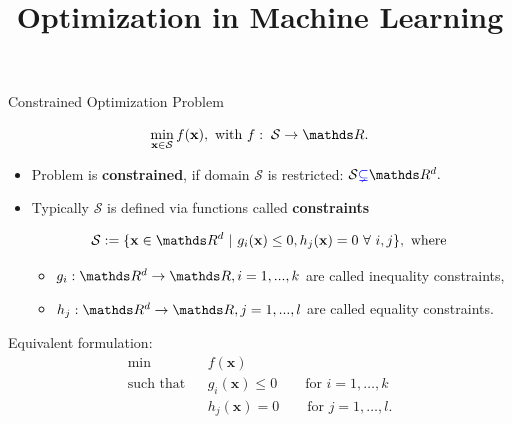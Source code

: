\documentclass[11pt,compress,t,notes=noshow, xcolor=table]{beamer}
\title{Optimization in Machine Learning}
\date{}
\begin{document}
\sloppy

\begin{vbframe}{Constrained Optimization Problem }

$$
\min_{\xv \in \mathcal{S}} \fx, \text{ with } f: \; \mathcal{S} \to \R.
$$

\begin{itemize}
	\item Problem is \textbf{constrained}, if domain $\mathcal{S}$ is restricted: $\mathcal{S} \textcolor{blue}{\subsetneq} \R^d.$

	\item Typically $\mathcal{S}$ is defined via functions called \textbf{constraints}

	$$
		\mathcal{S}:= \{\xv \in \R^d ~|~ g_i(\xv) \le 0, h_j(\xv) = 0 ~\forall~ i, j\}, \text{ where }
	$$ 

\begin{itemize}
\item $g_i: \R^d \to \R, i = 1, ..., k$ are called inequality constraints,
\item $h_j: \R^d \to \R, j = 1, ..., l$ are called equality constraints.
\end{itemize}

\end{itemize}

\lz 

Equivalent formulation: 
\begin{eqnarray*}
\min && f(\mathbf{x})  \\
\text{such that} && g_i(\mathbf{x}) \le 0 \qquad \text{for } i=1,\ldots,k  \\
 && h_j(\mathbf{x}) = 0 \qquad \text{for } j=1,\ldots,l. 
\end{eqnarray*}

\end{vbframe}
\end{document}
